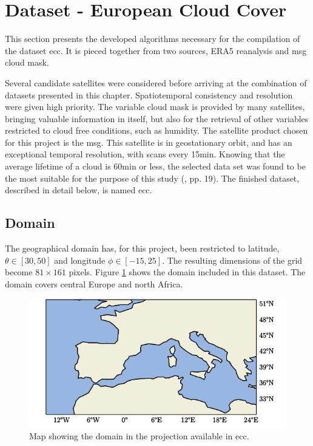 \section{Dataset - European Cloud Cover }
This section presents the developed algorithms necessary for the compilation of the dataset \acrfull{ecc}. It is pieced together from two sources, ERA5 reanalysis and \acrlong{msg} cloud mask.

Several candidate satellites were considered before arriving at the combination of datasets presented in this chapter. Spatiotemporal consistency and resolution were given high priority. The variable cloud mask is provided by many satellites, bringing valuable information in itself, but also for the retrieval of other variables restricted to cloud free conditions, such as humidity. The satellite product chosen for this project is the \acrfull{msg}. This satellite is in geostationary orbit, and has an exceptional temporal resolution, with scans every 15min. Knowing that the average lifetime of a cloud is 60min or less, the selected data set was found to be the most suitable for the purpose of this study (\cite{lohmann2016}, pp. 19). The finished dataset, described in detail below, is named \acrfull{ecc}.

\subsection{Domain}
The geographical domain has, for this project, been restricted to latitude, $\theta \in[30,50]$ and longitude $\phi \in [-15, 25]$. The resulting dimensions of the grid become $81\times161$ pixels. Figure \ref{fig:map} shows the domain included in this dataset. The domain covers central Europe and north Africa.
\begin{figure}[h]
    \centering
    \includegraphics[scale = 1.0]{python_figs/Domain.png}
    \caption[Map over domain.]{Map showing the domain in the projection available in \acrshort{ecc}.}
    \label{fig:map}
\end{figure}

